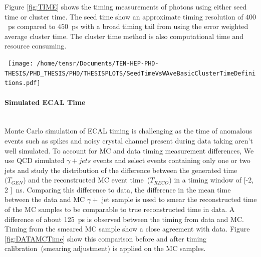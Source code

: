 Figure \ref{fig:TIME} shows the timing measurements of photons using either seed time or cluster time. The seed time show an approximate timing resolution of $400$~ps compared to $450$~ps with a broad timing tail from using the error weighted average cluster time. The cluster time method is also computational time and resource consuming.

\begin{center}
\centering
\mbox{
\texttt{[image: /home/tensr/Documents/TEN-HEP-PHD-THESIS/PHD\_THESIS/PHD/THESISPLOTS/SeedTimeVsWAveBasicClusterTimeDefinitions.pdf]}
}
\label{fig:TIME}
\end{center}
\paragraph*{Simulated ECAL Time} \mbox{} \\
  Monte Carlo simulation of ECAL timing is challenging  as the time of anomalous events such as spikes and noisy crystal channel  present during data taking 
aren't well simulated.  To account for MC and data timing measurement differences, 
We use QCD simulated $\gamma + jets$ events and select events containing only one or two jets and study the distribution of the difference between the generated time~$(T_{GEN}$) and the reconstructed MC event time~($T_{RECO}$) in a timing window of [-2, 2 ]~ns. Comparing this difference to data, the difference in the mean time between the data and MC $\gamma +$ jet sample is used to smear the reconstructed time of the MC samples to be comparable to true reconstructed time in data. A difference of about 125~ps is observed between the timing from data and MC.  Timing from the smeared MC sample show a close agreement with data.
Figure \ref{fig:DATAMCTime} show this comparison before and after timing calibration~(smearing adjustment) is applied on the MC samples.

